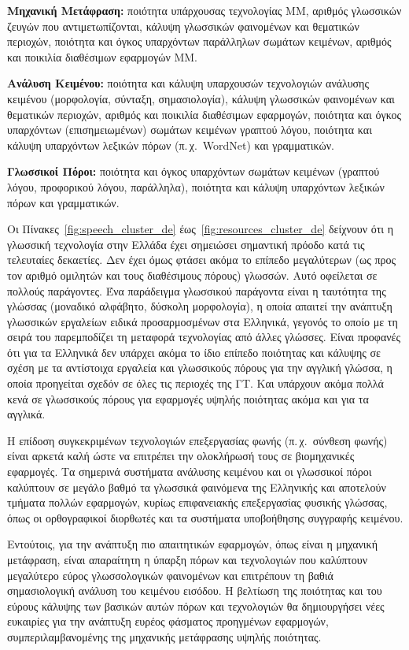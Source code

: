 \begin{multicols}{2}
\textbf{Μηχανική Μετάφραση:} ποιότητα υπάρχουσας τεχνολογίας ΜΜ, αριθμός γλωσσικών ζευγών που αντιμετωπίζονται, κάλυψη γλωσσικών φαινομένων και θεματικών περιοχών, ποιότητα και όγκος υπαρχόντων παράλληλων σωμάτων κειμένων, αριθμός και ποικιλία διαθέσιμων εφαρμογών ΜΜ.

\textbf{Ανάλυση Κειμένου:} ποιότητα και κάλυψη υπαρχουσών τεχνολογιών ανάλυσης κειμένου (μορφολογία, σύνταξη, σημασιολογία), κάλυψη γλωσσικών φαινομένων και θεματικών περιοχών, αριθμός και ποικιλία διαθέσιμων εφαρμογών, ποιότητα και όγκος υπαρχόντων (επισημειωμένων) σωμάτων κειμένων γραπτού λόγου, ποιότητα και κάλυψη υπαρχόντων λεξικών πόρων (π.\,χ.~WordNet) και γραμματικών.

\textbf{Γλωσσικοί Πόροι:} ποιότητα και όγκος υπαρχόντων σωμάτων κειμένων (γραπτού λόγου, προφορικού λόγου, παράλληλα), ποιότητα και κάλυψη υπαρχόντων λεξικών πόρων και γραμματικών.

Οι Πίνακες~\ref{fig:speech_cluster_de} έως~\ref{fig:resources_cluster_de} δείχνουν ότι η γλωσσική τεχνολογία στην Ελλάδα έχει σημειώσει σημαντική πρόοδο κατά τις τελευταίες δεκαετίες. Δεν έχει όμως φτάσει ακόμα το επίπεδο μεγαλύτερων (ως προς τον αριθμό ομιλητών και τους διαθέσιμους πόρους) γλωσσών. Αυτό οφείλεται σε πολλούς παράγοντες. Ένα παράδειγμα γλωσσικού παράγοντα είναι η ταυτότητα της γλώσσας (μοναδικό αλφάβητο, δύσκολη μορφολογία), η οποία απαιτεί την ανάπτυξη γλωσσικών εργαλείων ειδικά προσαρμοσμένων στα Ελληνικά, γεγονός το οποίο με τη σειρά του παρεμποδίζει τη μεταφορά τεχνολογίας από άλλες γλώσσες. Είναι προφανές ότι για τα Ελληνικά δεν υπάρχει ακόμα το ίδιο επίπεδο ποιότητας και κάλυψης σε σχέση με τα αντίστοιχα εργαλεία και γλωσσικούς πόρους για την αγγλική γλώσσα, η οποία προηγείται σχεδόν σε όλες τις περιοχές της ΓΤ. Και υπάρχουν ακόμα πολλά κενά σε γλωσσικούς πόρους για εφαρμογές υψηλής ποιότητας ακόμα και για τα αγγλικά.

Η επίδοση συγκεκριμένων τεχνολογιών επεξεργασίας φωνής (π.\,χ.~σύνθεση φωνής) είναι αρκετά καλή ώστε να επιτρέπει την ολοκλήρωσή τους σε βιομηχανικές εφαρμογές. Τα σημερινά συστήματα ανάλυσης κειμένου και οι γλωσσικοί πόροι καλύπτουν σε μεγάλο βαθμό τα γλωσσικά φαινόμενα της Ελληνικής και αποτελούν τμήματα πολλών εφαρμογών, κυρίως επιφανειακής επεξεργασίας φυσικής γλώσσας, όπως οι ορθογραφικοί διορθωτές και τα συστήματα υποβοήθησης συγγραφής κειμένου.

Εντούτοις, για την ανάπτυξη πιο απαιτητικών εφαρμογών, όπως είναι η μηχανική μετάφραση, είναι απαραίτητη η ύπαρξη πόρων και τεχνολογιών που καλύπτουν μεγαλύτερο εύρος γλωσσολογικών φαινομένων και επιτρέπουν τη βαθιά σημασιολογική ανάλυση του κειμένου εισόδου. Η βελτίωση της ποιότητας και του εύρους κάλυψης των βασικών αυτών πόρων και τεχνολογιών θα δημιουργήσει νέες ευκαιρίες για την ανάπτυξη ευρέος φάσματος προηγμένων εφαρμογών, συμπεριλαμβανομένης της μηχανικής μετάφρασης υψηλής ποιότητας.


\end{multicols}
